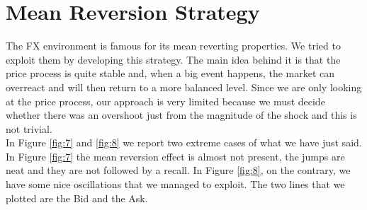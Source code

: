 \documentclass[a4paper]{article}
\begin{document}
\section{Mean Reversion Strategy}

The FX environment is famous for its mean reverting properties. We tried to exploit them by developing this strategy. The main idea behind it is that the price process is quite stable and, when a big event happens, the market can overreact and will then return to a more balanced level. Since we are only looking at the price process, our approach is very limited because we must decide whether there was an overshoot just from the magnitude of the shock and this is not trivial.\\
In Figure \ref{fig:7} and \ref{fig:8} we report two extreme cases of what we have just said. In Figure \ref{fig:7} the mean reversion effect is almost not present, the jumps are neat and they are not followed by a recall. In Figure \ref{fig:8}, on the contrary, we have some nice oscillations that we managed to exploit. The two lines that we plotted are the Bid and the Ask.
\end{document}
